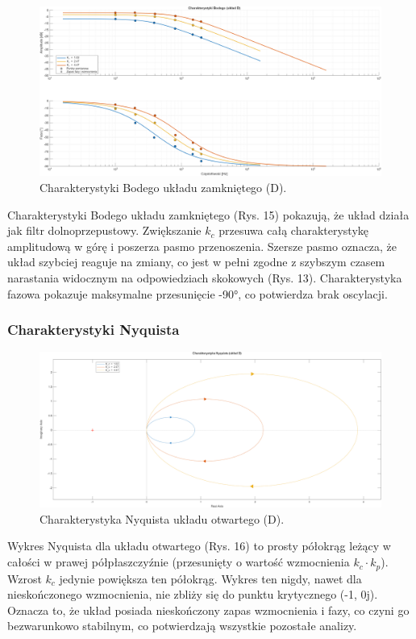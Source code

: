 \documentclass[12pt,a4paper]{article}
\begin{document}
	\begin{figure}[H]
		\centering
		\includegraphics[width=1\linewidth]{zdjecia/Bode_ukladD.png}
		\caption{Charakterystyki Bodego układu zamkniętego (D).}
		\label{fig:Bode_ukladD}
	\end{figure}
	
	Charakterystyki Bodego układu zamkniętego (Rys. 15) pokazują, że układ działa jak filtr dolnoprzepustowy. Zwiększanie $k_c$ przesuwa całą charakterystykę amplitudową w górę i poszerza pasmo przenoszenia. Szersze pasmo oznacza, że układ szybciej reaguje na zmiany, co jest w pełni zgodne z szybszym czasem narastania widocznym na odpowiedziach skokowych (Rys. 13). Charakterystyka fazowa pokazuje maksymalne przesunięcie -90°, co potwierdza brak oscylacji.
	
	\subsubsection{Charakterystyki Nyquista}
	
	\begin{figure}[H]
		\centering
		\includegraphics[width=0.8\linewidth]{zdjecia/NQ_ukladD.png}
		\caption{Charakterystyka Nyquista układu otwartego (D).}
		\label{fig:NQ_ukladD}
	\end{figure}
	
	Wykres Nyquista dla układu otwartego (Rys. 16) to prosty półokrąg leżący w całości w prawej półpłaszczyźnie (przesunięty o wartość wzmocnienia $k_c \cdot k_p$). Wzrost $k_c$ jedynie powiększa ten półokrąg. Wykres ten nigdy, nawet dla nieskończonego wzmocnienia, nie zbliży się do punktu krytycznego (-1, 0j). Oznacza to, że układ posiada nieskończony zapas wzmocnienia i fazy, co czyni go bezwarunkowo stabilnym, co potwierdzają wszystkie pozostałe analizy.
	
\end{document}
